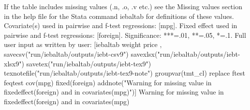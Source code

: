 If the table includes missing values (.n, .o, .v etc.) see the Missing values section in the help file for the Stata command iebaltab for definitions of these values. Covariate(s) used in pairwise and f-test regressions: [mpg]. Fixed effect used in pairwise and f-test regressions: [foreign]. Significance: ***=.01, **=.05, *=.1. Full user input as written by user: [iebaltab weight price , savecsv("run/iebaltab/outputs/iebt-csv9") savexlsx("run/iebaltab/outputs/iebt-xlsx9") savetex("run/iebaltab/outputs/iebt-tex9") texnotefile("run/iebaltab/outputs/iebt-tex9-note") groupvar(tmt\_cl) replace ftest feqtest cov(mpg) fixed(foreign) addnote("Warning for missing value in fixedeffect(foreign) and in covariates(mpg)")] Warning for missing value in fixedeffect(foreign) and in covariates(mpg)
